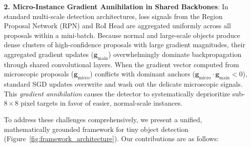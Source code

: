 \textbf{2. Micro-Instance Gradient Annihilation in Shared Backbones}: In standard multi-scale detection architectures, loss signals from the Region Proposal Network (RPN) and RoI Head are aggregated uniformly across all proposals within a mini-batch. Because normal and large-scale objects produce dense clusters of high-confidence proposals with large gradient magnitudes, their aggregated gradient updates ($\mathbf{g}_{\mathrm{main}}$) overwhelmingly dominate backpropagation through shared convolutional layers. When the gradient vector computed from microscopic proposals ($\mathbf{g}_{\mathrm{micro}}$) conflicts with dominant anchors ($\mathbf{g}_{\mathrm{micro}} \cdot \mathbf{g}_{\mathrm{main}} < 0$), standard SGD updates overwrite and wash out the delicate microscopic signals. This \emph{gradient annihilation} causes the detector to systematically deprioritize sub-$8\times 8$ pixel targets in favor of easier, normal-scale instances.

To address these challenges comprehensively, we present a unified, mathematically grounded framework for tiny object detection (Figure~\ref{fig:framework_architecture}). Our contributions are as follows:

